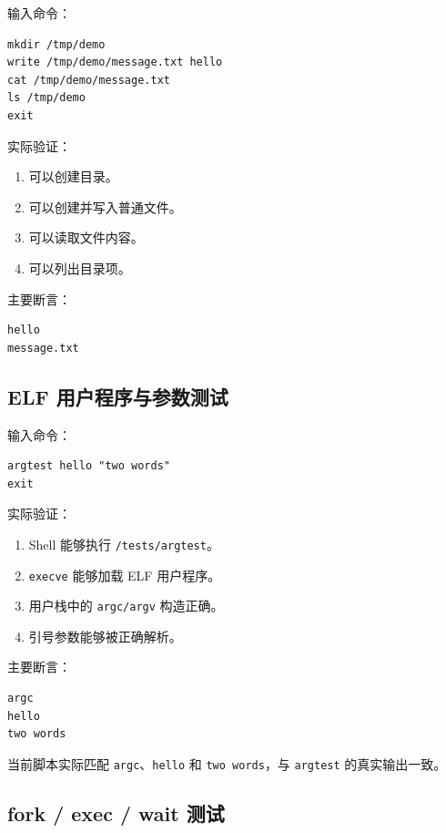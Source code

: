 \documentclass[UTF8,a4paper,12pt,openany,fontset=fandol]{ctexrep}
\begin{document}
输入命令：

\begin{lstlisting}
mkdir /tmp/demo
write /tmp/demo/message.txt hello
cat /tmp/demo/message.txt
ls /tmp/demo
exit
\end{lstlisting}

实际验证：

\begin{enumerate}
\item 可以创建目录。
\item 可以创建并写入普通文件。
\item 可以读取文件内容。
\item 可以列出目录项。
\end{enumerate}

主要断言：

\begin{lstlisting}
hello
message.txt
\end{lstlisting}

\subsection{ELF 用户程序与参数测试}

输入命令：

\begin{lstlisting}
argtest hello "two words"
exit
\end{lstlisting}

实际验证：

\begin{enumerate}
\item Shell 能够执行 \nolinkurl{/tests/argtest}。
\item \nolinkurl{execve} 能够加载 ELF 用户程序。
\item 用户栈中的 \nolinkurl{argc/argv} 构造正确。
\item 引号参数能够被正确解析。
\end{enumerate}

主要断言：

\begin{lstlisting}
argc
hello
two words
\end{lstlisting}

当前脚本实际匹配 \nolinkurl{argc}、\nolinkurl{hello} 和 \nolinkurl{two words}，与 \nolinkurl{argtest} 的真实输出一致。

\subsection{fork / exec / wait 测试}
\end{document}
